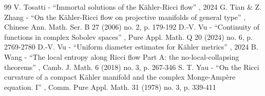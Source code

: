 \documentclass[11pt]{article}
\numberwithin{equation}{section}
\theoremstyle{definition}
\begin{document}
\begin{thebibliography}{99}
 V. Tosatti - “Immortal solutions of the Kähler-Ricci flow” , 2024
 G. Tian \& Z. Zhang - “On the Kähler-Ricci flow on projective manifolds of general type” , Chinese Ann. Math. Ser. B 27 (2006) no. 2, p. 179-192
 D.-V. Vu - “Continuity of functions in complex Sobolev spaces” , Pure Appl. Math. Q 20 (2024) no. 6, p. 2769-2780
 D.-V. Vu - “Uniform diameter estimates for Kähler metrics” , 2024
 B. Wang - “The local entropy along Ricci flow Part A: the no-local-collapsing theorems” , Camb. J. Math. 6 (2018) no. 3, p. 267-346
 S. T. Yau - “On the Ricci curvature of a compact Kähler manifold and the complex Monge-Ampère equation. I” , Comm. Pure Appl. Math. 31 (1978) no. 3, p. 339-411
\end{thebibliography}
\end{document}
